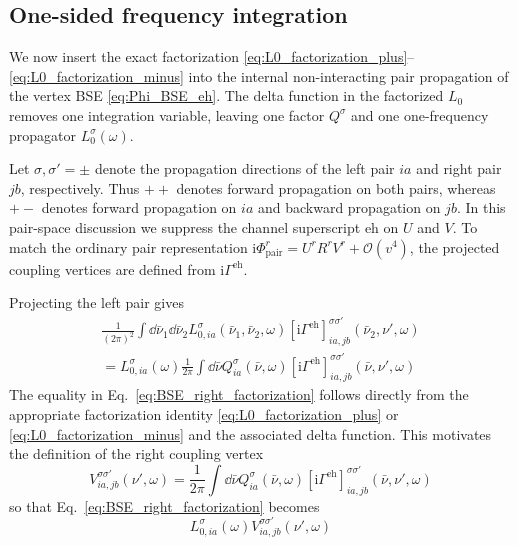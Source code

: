 \documentclass[aip,jcp,reprint,noshowkeys,superscriptaddress]{revtex4-1}
\newcommand{\ii}{\mathrm{i}}
\newcommand{\eh}{\text{eh}}
\begin{document}
\subsection{One-sided frequency integration}

We now insert the exact factorization
\eqref{eq:L0_factorization_plus}--\eqref{eq:L0_factorization_minus} into the
internal non-interacting pair propagation of the vertex BSE
\eqref{eq:Phi_BSE_eh}.
The delta function in the factorized $L_0$ removes one integration variable,
leaving one factor $Q^\sigma$ and one one-frequency propagator
$L_0^\sigma(\omega)$.

Let $\sigma,\sigma'=\pm$ denote the propagation directions of the left pair
$ia$ and right pair $jb$, respectively. Thus $++$ denotes forward propagation
on both pairs, whereas $+-$ denotes forward propagation on $ia$ and backward
propagation on $jb$.
In this pair-space discussion we suppress the channel superscript $\eh$ on
$U$ and $V$.
To match the ordinary pair representation
$\ii\Phi^r_{\mathrm{pair}}=U^rR^rV^r+\mathcal O(v^4)$,
the projected coupling vertices are defined from $\ii\Gamma^\eh$.

Projecting the left pair gives
\begin{multline}
	\frac{1}{(2\pi)^2}
	\int \dd{\bar\nu_1}\dd{\bar\nu_2}
	L_{0,ia}^{\sigma}(\bar\nu_1,\bar\nu_2,\omega)
	\left[
	\ii\Gamma^\eh
	\right]^{\sigma\sigma'}_{ia,jb}(\bar\nu_2,\nu',\omega)
	\\
	=
	L_{0,ia}^\sigma(\omega)
	\frac{1}{2\pi}
	\int \dd{\bar\nu}
	Q^\sigma_{ia}(\bar\nu,\omega)
	\left[
	\ii\Gamma^\eh
	\right]^{\sigma\sigma'}_{ia,jb}(\bar\nu,\nu',\omega)
	\label{eq:BSE_right_factorization}
\end{multline}
The equality in Eq.~\eqref{eq:BSE_right_factorization} follows directly from
the appropriate factorization identity
\eqref{eq:L0_factorization_plus} or
\eqref{eq:L0_factorization_minus} and the associated delta function.
This motivates the definition of the right coupling vertex
\begin{equation}
	V^{\sigma\sigma'}_{ia,jb}(\nu',\omega)
	=
	\frac{1}{2\pi}
	\int \dd{\bar\nu}
	Q^\sigma_{ia}(\bar\nu,\omega)
	\left[
	\ii\Gamma^\eh
	\right]^{\sigma\sigma'}_{ia,jb}(\bar\nu,\nu',\omega)
	\label{eq:V_def}
\end{equation}
so that Eq.~\eqref{eq:BSE_right_factorization} becomes
\begin{equation}
	L_{0,ia}^\sigma(\omega)
	V^{\sigma\sigma'}_{ia,jb}(\nu',\omega)
	\label{eq:BSE_right_compact}
\end{equation}
\end{document}
